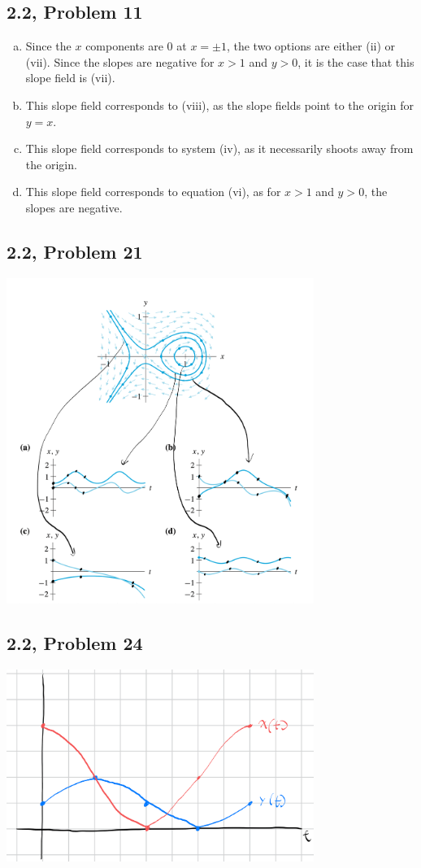 \documentclass[10pt]{mypackage}
\begin{document}
\subsection{2.2, Problem 11}%
\begin{enumerate}[(a)]
  \item Since the $x$ components are $0$ at $x=\pm 1$, the two options are either (ii) or (vii). Since the slopes are negative for $x > 1$ and $y > 0$, it is the case that this slope field is (vii).
  \item This slope field corresponds to (viii), as the slope fields point to the origin for $y=x$.
  \item This slope field corresponds to system (iv), as it necessarily shoots away from the origin.
  \item This slope field corresponds to equation (vi), as for $x > 1$ and $y > 0$, the slopes are negative.
\end{enumerate}
\subsection{2.2, Problem 21}%
\begin{center}
  \includegraphics[width=10cm]{images/2_2_21.png}
\end{center}
\subsection{2.2, Problem 24}%
\begin{center}
  \includegraphics[width=10cm]{images/2_2_24.png}
\end{center}
\end{document}
